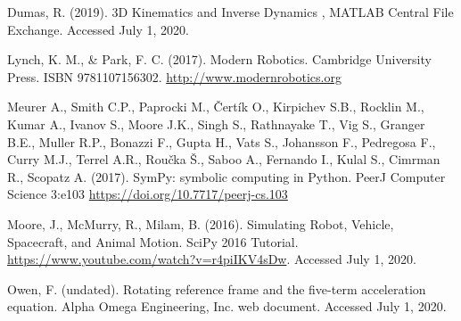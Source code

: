 Dumas, R. (2019). 3D Kinematics and Inverse Dynamics , MATLAB Central File Exchange. Accessed July 1, 2020.

Lynch, K. M., \& Park, F. C. (2017). Modern Robotics. Cambridge University Press. ISBN 9781107156302. \url{http://www.modernrobotics.org}

Meurer A., Smith C.P., Paprocki M., Čertík O., Kirpichev S.B., Rocklin M., Kumar A., Ivanov S., Moore J.K., Singh S., Rathnayake T., Vig S., Granger B.E., Muller R.P., Bonazzi F., Gupta H., Vats S., Johansson F., Pedregosa F., Curry M.J., Terrel A.R., Roučka Š., Saboo A., Fernando I., Kulal S., Cimrman R., Scopatz A. (2017). SymPy: symbolic computing in Python. PeerJ Computer Science 3:e103 \url{https://doi.org/10.7717/peerj-cs.103}

Moore, J., McMurry, R., Milam, B. (2016). Simulating Robot, Vehicle, Spacecraft, and Animal Motion. SciPy 2016 Tutorial. \url{https://www.youtube.com/watch?v=r4piIKV4sDw}. Accessed July 1, 2020.

Owen, F. (undated). Rotating reference frame and the five-term acceleration equation. Alpha Omega Engineering, Inc. web document. Accessed July 1, 2020.
